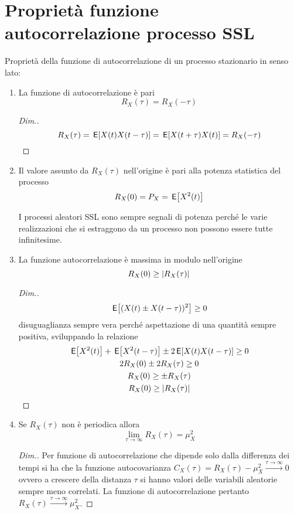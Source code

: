 \clearpage
\section{Proprietà funzione autocorrelazione processo SSL}
Proprietà della funzione di autocorrelazione di un processo stazionario in senso lato:
\begin{enumerate}
\item La funzione di autocorrelazione è pari
\[R_X(\tau)=R_X(-\tau)\]
\begin{proof}[Dim.]
\[R_X(\tau)=\,{\operatorname{\mathsf{E}}}\!\left[{X(t)X(t-\tau)}\right]=\,{\operatorname{\mathsf{E}}}\!\left[{X(t+\tau)X(t)}\right]=R_X(-\tau)\]
\end{proof}

\item Il valore assunto da $R_X(\tau)$ nell'origine è pari alla potenza statistica del processo
\[R_X(0)=P_X=\,{\operatorname{\mathsf{E}}}\!\left[{X^2(t)}\right]\]
\begin{nota}I processi aleatori SSL sono sempre segnali di potenza perché le varie realizzazioni che si estraggono da un processo non possono essere tutte infinitesime.\end{nota}

\item La funzione autocorrelazione è massima in modulo nell'origine
\[R_X(0)\geq\left|{R_X(\tau)}\right|\]

\begin{proof}[Dim.]
\[\,{\operatorname{\mathsf{E}}}\!\left[{(X(t)\pm X(t-\tau))^2}\right]\geq 0\]
disuguaglianza sempre vera perché aspettazione di una quantità sempre positiva, sviluppando la relazione
\begin{gather*}\,{\operatorname{\mathsf{E}}}\!\left[{X^2(t)}\right]+\,{\operatorname{\mathsf{E}}}\!\left[{X^2(t-\tau)}\right]\pm 2 \,{\operatorname{\mathsf{E}}}\!\left[{X(t)X(t-\tau)}\right]\geq 0\\2R_X(0)\pm 2R_X(\tau)\geq 0\\R_X(0)\geq\pm R_X(\tau)\\ R_X(0)\geq\left|{R_X(\tau)}\right|\end{gather*}
\end{proof}

\item Se $R_X(\tau)$ non è periodica allora \begin{equation}\lim\limits_{\tau\to\infty}R_X(\tau)=\mu^2_X\end{equation}
\begin{proof}[Dim.]
Per funzione di autocorrelazione che dipende solo dalla differenza dei tempi si ha che la funzione autocovarianza $C_X(\tau)=R_X(\tau)-\mu^2_X\xrightarrow{\tau\to\infty}0$ ovvero a crescere della distanza $\tau$ si hanno valori delle variabili aleatorie sempre meno correlati. La funzione di autocorrelazione pertanto $R_X(\tau)\xrightarrow{\tau\to\infty}\mu^2_X$.
\end{proof}
\end{enumerate}

